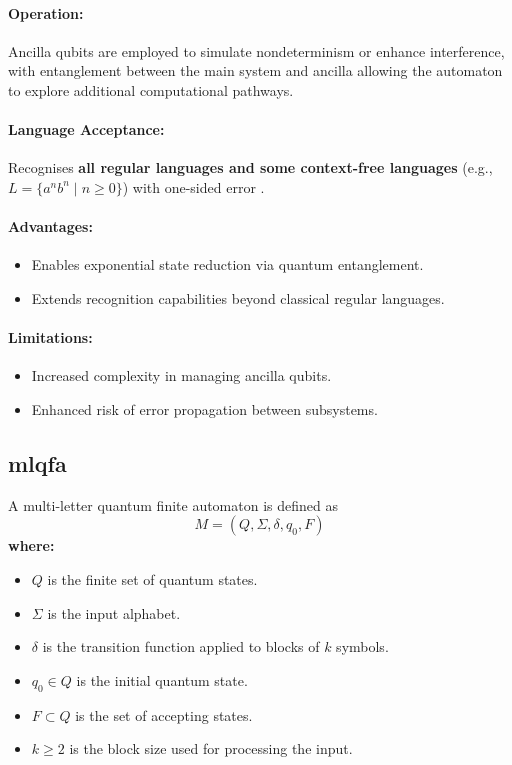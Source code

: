 \paragraph{Operation:}  
Ancilla qubits are employed to simulate nondeterminism or enhance interference, with entanglement between the main system and ancilla allowing the automaton to explore additional computational pathways.

\paragraph{Language Acceptance:}  
Recognises \textbf{all regular languages and some context-free languages} (e.g., \( L = \{a^n b^n \mid n \geq 0\} \)) with one-sided error \cite{yakaryilmaz2011}.

\paragraph{Advantages:}
\begin{itemize}
    \item Enables exponential state reduction via quantum entanglement.
    \item Extends recognition capabilities beyond classical regular languages.
\end{itemize}

\paragraph{Limitations:}
\begin{itemize}
    \item Increased complexity in managing ancilla qubits.
    \item Enhanced risk of error propagation between subsystems.
\end{itemize}

\subsection{\acrfull{mlqfa}}
\label{subsec:ml-qfa}
\begin{definition}
A multi-letter quantum finite automaton is defined as 
\[
M = (Q, \Sigma, \delta, q_0, F)
\]
\textbf{where:}
\begin{itemize}
    \item \( Q \) is the finite set of quantum states.
    \item \( \Sigma \) is the input alphabet.
    \item \( \delta \) is the transition function applied to blocks of \( k \) symbols.
    \item \( q_0 \in Q \) is the initial quantum state.
    \item \( F \subset Q \) is the set of accepting states.
    \item \( k \geq 2 \) is the block size used for processing the input.
\end{itemize}
\end{definition}


